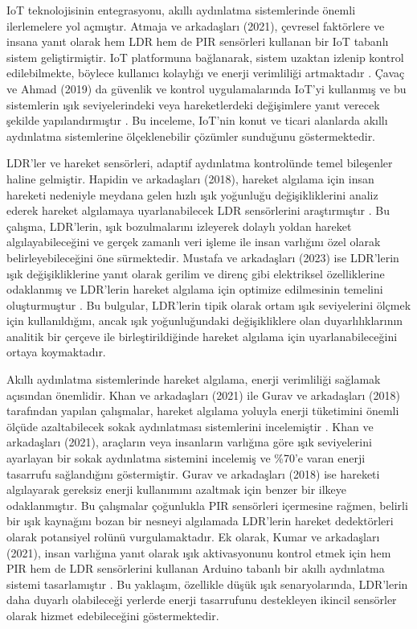 IoT teknolojisinin entegrasyonu, akıllı aydınlatma sistemlerinde önemli ilerlemelere yol açmıştır. Atmaja ve arkadaşları (2021), çevresel faktörlere ve insana yanıt olarak hem LDR hem de PIR sensörleri kullanan bir IoT tabanlı sistem geliştirmiştir. IoT platformuna bağlanarak, sistem uzaktan izlenip kontrol edilebilmekte, böylece kullanıcı kolaylığı ve enerji verimliliği artmaktadır \cite{Atmaja_2021}. Çavaç ve Ahmad (2019) da güvenlik ve kontrol uygulamalarında IoT’yi kullanmış ve bu sistemlerin ışık seviyelerindeki veya hareketlerdeki değişimlere yanıt verecek şekilde yapılandırmıştır \cite{ccavacs2019review}. Bu inceleme, IoT'nin konut ve ticari alanlarda akıllı aydınlatma sistemlerine ölçeklenebilir çözümler sunduğunu göstermektedir.

LDR'ler ve hareket sensörleri, adaptif aydınlatma kontrolünde temel bileşenler haline gelmiştir. Hapidin ve arkadaşları (2018), hareket algılama için insan hareketi nedeniyle meydana gelen hızlı ışık yoğunluğu değişikliklerini analiz ederek hareket algılamaya uyarlanabilecek LDR sensörlerini araştırmıştır \cite{8727728}. Bu çalışma, LDR'lerin, ışık bozulmalarını izleyerek dolaylı yoldan hareket algılayabileceğini ve gerçek zamanlı veri işleme ile insan varlığını özel olarak belirleyebileceğini öne sürmektedir. Mustafa ve arkadaşları (2023) ise LDR'lerin ışık değişikliklerine yanıt olarak gerilim ve direnç gibi elektriksel özelliklerine odaklanmış ve LDR'lerin hareket algılama için optimize edilmesinin temelini oluşturmuştur \cite{mustafa2023measuring}. Bu bulgular, LDR'lerin tipik olarak ortam ışık seviyelerini ölçmek için kullanıldığını, ancak ışık yoğunluğundaki değişikliklere olan duyarlılıklarının analitik bir çerçeve ile birleştirildiğinde hareket algılama için uyarlanabileceğini ortaya koymaktadır.


Akıllı aydınlatma sistemlerinde hareket algılama, enerji verimliliği sağlamak açısından önemlidir. Khan ve arkadaşları (2021) ile Gurav ve arkadaşları (2018) tarafından yapılan çalışmalar, hareket algılama yoluyla enerji tüketimini önemli ölçüde azaltabilecek sokak aydınlatması sistemlerini incelemiştir \cite{khan2021movement, gurav2018movement}. Khan ve arkadaşları (2021), araçların veya insanların varlığına göre ışık seviyelerini ayarlayan bir sokak aydınlatma sistemini incelemiş ve \%70’e varan enerji tasarrufu sağlandığını göstermiştir. Gurav ve arkadaşları (2018) ise hareketi algılayarak gereksiz enerji kullanımını azaltmak için benzer bir ilkeye odaklanmıştır. Bu çalışmalar çoğunlukla PIR sensörleri içermesine rağmen, belirli bir ışık kaynağını bozan bir nesneyi algılamada LDR'lerin hareket dedektörleri olarak potansiyel rolünü vurgulamaktadır. Ek olarak, Kumar ve arkadaşları (2021), insan varlığına yanıt olarak ışık aktivasyonunu kontrol etmek için hem PIR hem de LDR sensörlerini kullanan Arduino tabanlı bir akıllı aydınlatma sistemi tasarlamıştır \cite{9667610}. Bu yaklaşım, özellikle düşük ışık senaryolarında, LDR'lerin daha duyarlı olabileceği yerlerde enerji tasarrufunu destekleyen ikincil sensörler olarak hizmet edebileceğini göstermektedir.


